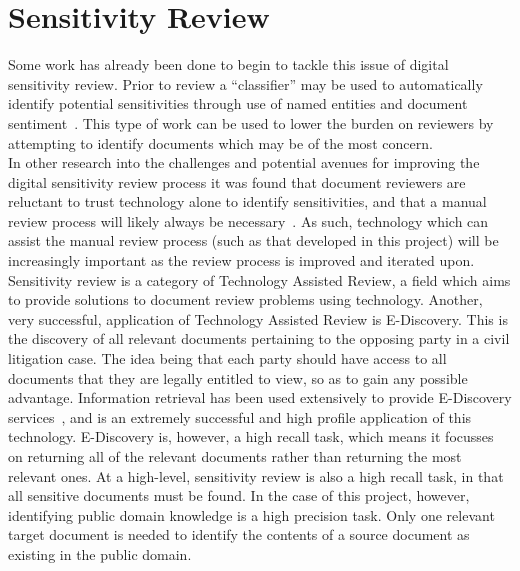 \documentclass{l4proj}
\begin{document}
\section{Sensitivity Review}
Some work has already been done to begin to tackle this issue of digital sensitivity review. Prior to review a ``classifier'' may be used to automatically identify potential sensitivities through use of named entities and document sentiment~\cite{mcdonald2014towards}. This type of work can be used to lower the burden on reviewers by attempting to identify documents which may be of the most concern. \\
In other research into the challenges and potential avenues for improving the digital sensitivity review process it was found that document reviewers are reluctant to trust technology alone to identify sensitivities, and that a manual review process will likely always be necessary~\cite{gollins2014using}. 
As such, technology which can assist the manual review process (such as that developed in this project) will be increasingly important as the review process is improved and iterated upon.\\
Sensitivity review is a category of Technology Assisted Review, a field which aims to provide solutions to document review problems using technology. Another, very successful, application of Technology Assisted Review is E-Discovery. This is the discovery of all relevant documents pertaining to the opposing party in a civil litigation case. The idea being that each party should have access to all documents that they are legally entitled to view, so as to gain any possible advantage. Information retrieval has been used extensively to provide E-Discovery services~\cite{oard2013information}, and is an extremely successful and high profile application of this technology. E-Discovery is, however, a high recall task, which means it focusses on returning all of the relevant documents rather than returning the most relevant ones. At a high-level, sensitivity review is also a high recall task, in that all sensitive documents must be found. In the case of this project, however, identifying public domain knowledge is a high precision task. Only one relevant target document is needed to identify the contents of a source document as existing in the public domain.
\end{document}

